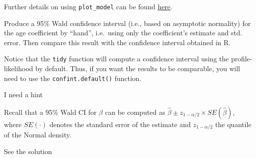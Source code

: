 \documentclass[
  letterpaper,
  DIV=11,
  numbers=noendperiod]{scrartcl}
\newenvironment{Shaded}{\begin{snugshade}}{\end{snugshade}}
\newcommand{\CommentTok}[1]{\textcolor[rgb]{0.37,0.37,0.37}{#1}}
\newcommand{\DecValTok}[1]{\textcolor[rgb]{0.68,0.00,0.00}{#1}}
\newcommand{\FloatTok}[1]{\textcolor[rgb]{0.68,0.00,0.00}{#1}}
\newcommand{\FunctionTok}[1]{\textcolor[rgb]{0.28,0.35,0.67}{#1}}
\newcommand{\NormalTok}[1]{\textcolor[rgb]{0.00,0.23,0.31}{#1}}
\newcommand{\OtherTok}[1]{\textcolor[rgb]{0.00,0.23,0.31}{#1}}
\newcommand{\SpecialCharTok}[1]{\textcolor[rgb]{0.37,0.37,0.37}{#1}}
\newcommand{\StringTok}[1]{\textcolor[rgb]{0.13,0.47,0.30}{#1}}
\begin{document}
Further details on using \texttt{plot\_model} can be found
\href{https://strengejacke.wordpress.com/2017/10/23/one-function-to-rule-them-all-visualization-of-regression-models-in-rstats-w-sjplot/}{here}.

\begin{tcolorbox}[enhanced jigsaw, colframe=quarto-callout-warning-color-frame, toprule=.15mm, toptitle=1mm, opacitybacktitle=0.6, breakable, colback=white, opacityback=0, title={Task}, rightrule=.15mm, bottomrule=.15mm, coltitle=black, colbacktitle=quarto-callout-warning-color!10!white, leftrule=.75mm, left=2mm, arc=.35mm, bottomtitle=1mm, titlerule=0mm]

Produce a 95\% Wald confidence interval (i.e., based on asymptotic
normality) for the age coefficient by ``hand'', i.e.~using only the
coefficient's estimate and std. error. Then compare this result with the
confidence interval obtained in R.

Notice that the \texttt{tidy} function will compute a confidence
interval using the profile-likelihood by default. Thus, if you want the
results to be comparable, you will need to use the
\texttt{confint.default()} function.

I need a hint

Recall that a 95\% Wald CI for \(\beta\) can be computed as
\(\hat{\beta} \pm z_{1-\alpha/2} \times SE(\hat{\beta})\), where
\(SE(\cdot)\) denotes the standard error of the estimate and
\(z_{1-\alpha/2}\) the quantile of the Normal density.

See the solution

\begin{Shaded}
\end{Shaded}


\end{tcolorbox}
\end{document}
